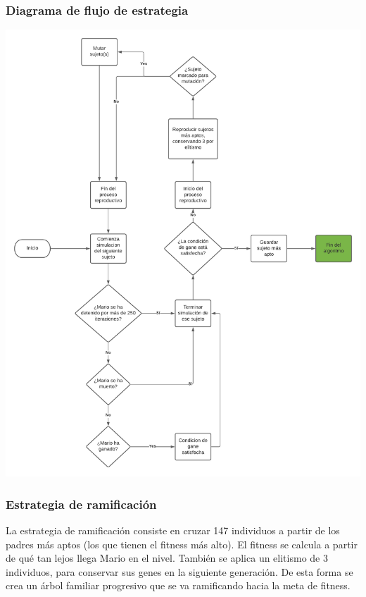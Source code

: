 \documentclass{article}
\begin{document}
\subsubsection{Diagrama de flujo de estrategia}
\begin{center}
  \includegraphics[scale=0.5]{neat/flujo.png}
\end{center}

\subsubsection{Estrategia de ramificación}
La estrategia de ramificación consiste en cruzar 147 individuos a partir de los padres más aptos (los que tienen el fitness más alto). El fitness se calcula a partir de qué tan lejos llega Mario en el nivel. También se aplica un elitismo de 3 individuos, para conservar sus genes en la siguiente generación. De esta forma se crea un árbol familiar progresivo que se va ramificando hacia la meta de fitness.
\end{document}
